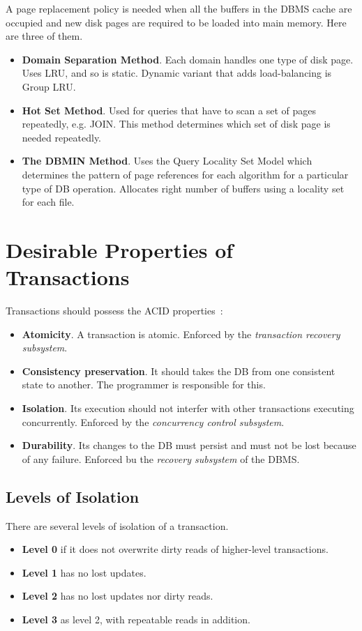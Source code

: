 A page replacement policy is needed when all the buffers in the DBMS cache are occupied and new disk pages are required to be loaded into main memory. Here are three of them.

\begin{itemize}
    \item \textbf{Domain Separation Method}. Each domain handles one type of disk page. Uses LRU, and so is static. Dynamic variant that adds load-balancing is Group LRU.
    \item \textbf{Hot Set Method}. Used for queries that have to scan a set of pages repeatedly, e.g. JOIN. This method determines which set of disk page is needed repeatedly.
    \item \textbf{The DBMIN Method}. Uses the Query Locality Set Model which determines the pattern of page references for each algorithm for a particular type of DB operation. Allocates right number of buffers using a locality set for each file.
\end{itemize}

\section{Desirable Properties of Transactions}
Transactions should possess the ACID properties~:

\begin{itemize}
    \item \textbf{Atomicity}. A transaction is atomic. Enforced by the \textit{transaction recovery subsystem}.
    \item \textbf{Consistency preservation}. It should takes the DB from one consistent state to another. The programmer is responsible for this.
    \item \textbf{Isolation}. Its execution should not interfer with other transactions executing concurrently. Enforced by the \textit{concurrency control subsystem}.
    \item \textbf{Durability}. Its changes to the DB must persist and must not be lost because of any failure. Enforced bu the \textit{recovery subsystem} of the DBMS.
\end{itemize}

\subsection{Levels of Isolation}
There are several levels of isolation of a transaction.

\begin{itemize}
    \item \textbf{Level 0} if it does not overwrite dirty reads of higher-level transactions.
    \item \textbf{Level 1} has no lost updates.
    \item \textbf{Level 2} has no lost updates nor dirty reads.
    \item \textbf{Level 3} as level 2, with repeatable reads in addition.
\end{itemize}


